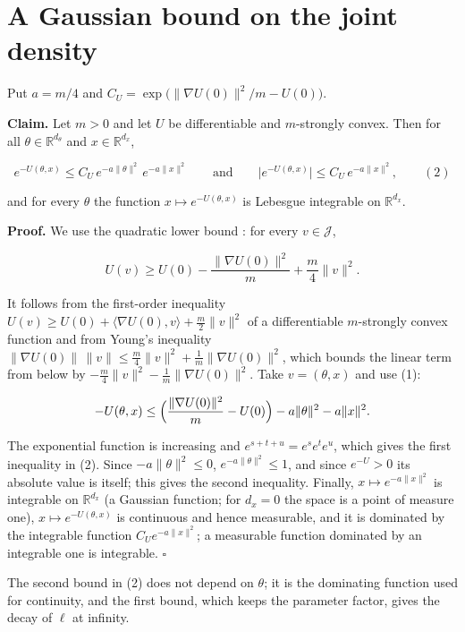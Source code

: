 \documentclass[11pt,a4paper]{article}
\begin{document}
\section{\texorpdfstring{A Gaussian bound on the joint density}{A Gaussian bound on the joint density}}


Put \(a=m/4\) and \(C_U=\exp\bigl(\|\nabla U(0)\|^2/m-U(0)\bigr)\).




\textbf{Claim.} Let \(m>0\) and let \(U\) be differentiable and \(m\)-strongly convex. Then for all \(\theta\in\mathbb R^{d_\theta}\) and \(x\in\mathbb R^{d_x}\),


\[e^{-U(\theta,x)}\le C_U\,e^{-a\|\theta\|^2}\,e^{-a\|x\|^2}\qquad\text{and}\qquad\bigl|e^{-U(\theta,x)}\bigr|\le C_U\,e^{-a\|x\|^2},\qquad(2)\]


and for every \(\theta\) the function \(x\mapsto e^{-U(\theta,x)}\) is Lebesgue integrable on \(\mathbb R^{d_x}\).




\textbf{Proof.} We use the quadratic lower bound \cite[Section~3.26.5]{LangevinLean2026ULASC}: for every \(v\in\mathcal J\),


\[U(v)\ge U(0)-\frac{\|\nabla U(0)\|^2}m+\frac m4\|v\|^2 .\]


It follows from the first-order inequality \(U(v)\ge U(0)+\langle\nabla U(0),v\rangle+\frac m2\|v\|^2\) of a differentiable \(m\)-strongly convex function and from Young's inequality \(\|\nabla U(0)\|\,\|v\|\le\frac m4\|v\|^2+\frac1m\|\nabla U(0)\|^2\), which bounds the linear term from below by \(-\frac m4\|v\|^2-\frac1m\|\nabla U(0)\|^2\). Take \(v=(\theta,x)\) and use (1):


\[-U(\theta,x)\le\Bigl(\frac{\|\nabla U(0)\|^2}m-U(0)\Bigr)-a\|\theta\|^2-a\|x\|^2 .\]


The exponential function is increasing and \(e^{s+t+u}=e^se^te^u\), which gives the first inequality in (2). Since \(-a\|\theta\|^2\le0\), \(e^{-a\|\theta\|^2}\le1\), and since \(e^{-U}>0\) its absolute value is itself; this gives the second inequality. Finally, \(x\mapsto e^{-a\|x\|^2}\) is integrable on \(\mathbb R^{d_x}\) (a Gaussian function; for \(d_x=0\) the space is a point of measure one), \(x\mapsto e^{-U(\theta,x)}\) is continuous and hence measurable, and it is dominated by the integrable function \(C_Ue^{-a\|x\|^2}\); a measurable function dominated by an integrable one is integrable. \(\square\)




The second bound in (2) does not depend on \(\theta\); it is the dominating function used for continuity, and the first bound, which keeps the parameter factor, gives the decay of \(\ell\) at infinity.
\end{document}
